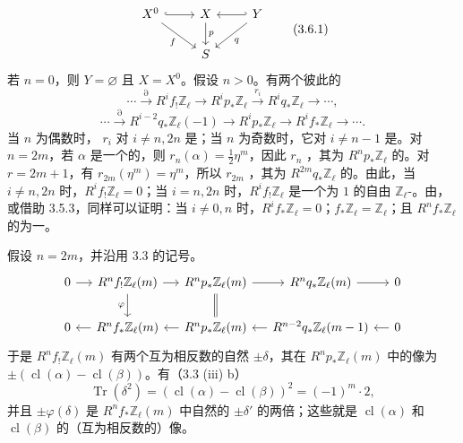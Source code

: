 \[
\begin{tikzcd}
X^0\arrow[r,hook]\arrow[dr,"f"']&X\arrow[d,"p"]&Y\arrow[l,hook']\arrow[dl,"q"]\\
&S&
\end{tikzcd}\tag{3.6.1}
\]
若 $n=0$，则 $Y=\varnothing$ 且 $X=X^0$。假设 $n>0$。有两个彼此的
\[
\cdots\xrightarrow{\partial}R^if_!\mathbb Z_\ell\longrightarrow R^ip_*\mathbb Z_\ell
\xrightarrow{r_i}R^iq_*\mathbb Z_\ell\longrightarrow\cdots,\tag{3.6.2}
\]
\[
\cdots\xrightarrow{\partial}R^{i-2}q_*\mathbb Z_\ell(-1)\longrightarrow R^ip_*\mathbb Z_\ell
\longrightarrow R^if_*\mathbb Z_\ell\longrightarrow\cdots.\tag{3.6.3}
\]
当 $n$ 为偶数时， $r_i$ 对 $i\ne n,2n$ 是；当 $n$ 为奇数时，它对 $i\ne n-1$ 是。对 $n=2m$，若 $\alpha$ 是一个的，则 $r_n(\alpha)=\tfrac12\eta^m$，因此 $r_n$ ，其为 $R^np_*\mathbb Z_\ell$ 的。对 $r=2m+1$，有 $r_{2m}(\eta^m)=\eta^m$，所以 $r_{2m}$ ，其为 $R^{2m}q_*\mathbb Z_\ell$ 的。由此，当 $i\ne n,2n$ 时，$R^if_!\mathbb Z_\ell=0$；当 $i=n,2n$ 时，$R^if_!\mathbb Z_\ell$ 是一个为 $1$ 的自由 $\mathbb Z_\ell$-。由，或借助 3.5.3，同样可以证明：当 $i\ne0,n$ 时，$R^if_*\mathbb Z_\ell=0$；$f_*\mathbb Z_\ell=\mathbb Z_\ell$；且 $R^nf_*\mathbb Z_\ell$ 的为一。

假设 $n=2m$，并沿用 3.3 的记号。
\[
\begin{tikzcd}[column sep=small]
0\arrow[r]&R^nf_!\mathbb Z_\ell(m)\arrow[r]\arrow[d,"\varphi"']&R^np_*\mathbb Z_\ell(m)\arrow[r]\arrow[d,equal]&R^nq_*\mathbb Z_\ell(m)\arrow[r]&0\\
0&R^nf_*\mathbb Z_\ell(m)\arrow[l]&R^np_*\mathbb Z_\ell(m)\arrow[l]&R^{n-2}q_*\mathbb Z_\ell(m-1)\arrow[l]&0\arrow[l]
\end{tikzcd}
\]
于是 $R^nf_!\mathbb Z_\ell(m)$ 有两个互为相反数的自然 $\pm\delta$，其在 $R^np_*\mathbb Z_\ell(m)$ 中的像为 $\pm(\operatorname{cl}(\alpha)-\operatorname{cl}(\beta))$。有（3.3 (iii) b）
\[
\operatorname{Tr}(\delta^2)=(\operatorname{cl}(\alpha)-\operatorname{cl}(\beta))^2=(-1)^m\cdot2,
\]
并且 $\pm\varphi(\delta)$ 是 $R^nf_*\mathbb Z_\ell(m)$ 中自然的 $\pm\delta'$ 的两倍；这些就是 $\operatorname{cl}(\alpha)$ 和 $\operatorname{cl}(\beta)$ 的（互为相反数的）像。

